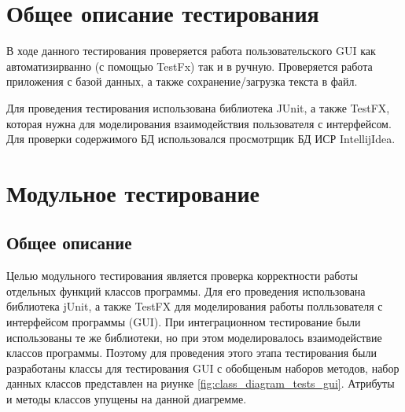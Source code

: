\documentclass[a4paper,12pt]{article}
\begin{document}
\newpage\section{Общее описание тестирования}
В ходе данного тестирования проверяется работа пользовательского GUI как автоматизирванно (с помощью TestFx) так и в ручную. Проверяется работа приложения с базой данных, а также сохранение/загрузка текста в файл.

\par Для проведения тестирования использована библиотека JUnit, а также TestFX, которая нужна для моделирования взаимодействия пользователя с интерфейсом. Для проверки содержимого БД использовался просмотрщик БД ИСР IntellijIdea.

\newpage \section{Модульное тестирование}
\subsection{Общее описание}
Целью модульного тестирования является проверка корректности работы отдельных функций классов программы.
Для его проведения использована библиотека jUnit, а также TestFX для моделирования работы полльзователя с интерфейсом программы (GUI). При интеграционном тестирование были использованы те же библиотеки, но при этом моделировалось взаимодействие классов программы. Поэтому для проведения этого этапа тестирования были разработаны классы для тестирования GUI с обобщеным наборов методов, набор данных классов представлен на риунке \ref{fig:class_diagram_tests_gui}. Атрибуты и методы классов упущены на данной диагремме.
\end{document}
